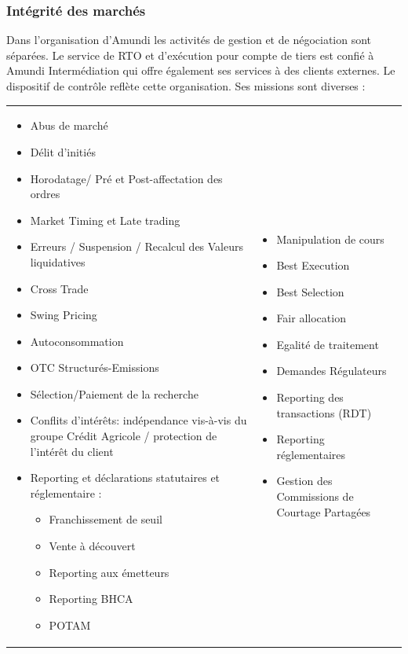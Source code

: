 \documentclass[12pt,a4paper]{report}
\begin{document}
\subsubsection{Intégrité des marchés}
Dans l’organisation d’Amundi les activités de gestion et de négociation sont séparées. Le service de RTO et d’exécution pour compte de tiers est confié à Amundi Intermédiation qui offre également ses services à des clients externes. Le dispositif de contrôle reflète cette organisation. Ses missions sont diverses : \newline
\begin{tabular}{p{}p{}}
\flushleft 
\begin{itemize}
\item Abus de marché
\item Délit d’initiés
\item Horodatage/ Pré et Post-affectation des ordres
\item Market Timing et Late trading
\item Erreurs / Suspension / Recalcul des Valeurs liquidatives
\item Cross Trade
\item Swing Pricing
\item Autoconsommation
\item OTC Structurés-Emissions
\item Sélection/Paiement de la recherche
\item Conflits d’intérêts: indépendance vis-à-vis du groupe Crédit Agricole / protection de l’intérêt du client
\item Reporting et déclarations statutaires et réglementaire :
\begin{itemize}
\item Franchissement de seuil
\item Vente à découvert
\item Reporting aux émetteurs
\item Reporting BHCA
\item POTAM
\end{itemize}
\end{itemize}

& \flushright
\begin{itemize}
\item Manipulation de cours
\item Best Execution
\item Best Selection
\item Fair allocation
\item Egalité de traitement
\item Demandes Régulateurs
\item Reporting des transactions (RDT)
\item Reporting réglementaires
\item Gestion des Commissions de Courtage Partagées
\end{itemize}

\end{tabular}
\end{document}
